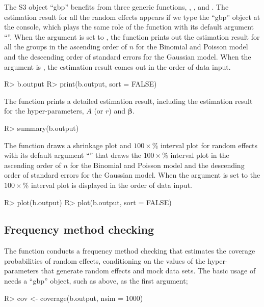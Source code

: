 \documentclass[article]{jss}
\begin{document}
The S3 object ``gbp'' benefits from three generic functions, , , and . The estimation result for all the random effects appears if we type the ``gbp'' object at the  console, which plays the same role of the function  with its default argument ``''. When the argument  is set to , the function  prints out the estimation result for all the groups in the ascending order of $n$ for the Binomial and Poisson model and the descending order of standard errors for the Gaussian model. When the argument  is , the estimation result comes out in the order of data input.
\begin{CodeChunk}
\begin{CodeInput}
R> b.output
R> print(b.output, sort = FALSE)
\end{CodeInput}
\end{CodeChunk}

The function  prints a detailed estimation result, including the estimation result for the hyper-parameters, $A$ (or $r$) and $\boldsymbol{\beta}$.
\begin{CodeChunk}
\begin{CodeInput}
R> summary(b.output)
\end{CodeInput}
\end{CodeChunk}

The function  draws a shrinkage plot and $100\times$\% interval plot for random effects with its default argument ``'' that draws the $100\times$\% interval plot in the ascending order of $n$ for the Binomial and Poisson model and the descending order of standard errors for the Gaussian model. When the argument  is set to   the $100\times$\% interval plot is displayed in the order of data input.
\begin{CodeChunk}
\begin{CodeInput}
R> plot(b.output)
R> plot(b.output, sort = FALSE)
\end{CodeInput}
\end{CodeChunk}

\subsection{Frequency method checking}
The function  conducts a frequency method checking that estimates the coverage probabilities of  random effects, conditioning on the values of the hyper-parameters that generate random effects and  mock data sets. The basic usage of  needs a ``gbp'' object, such as  above, as the first argument;
\begin{CodeChunk}
\begin{CodeInput}
R> cov <- coverage(b.output, nsim = 1000)
\end{CodeInput}
\end{CodeChunk}
\end{document}
